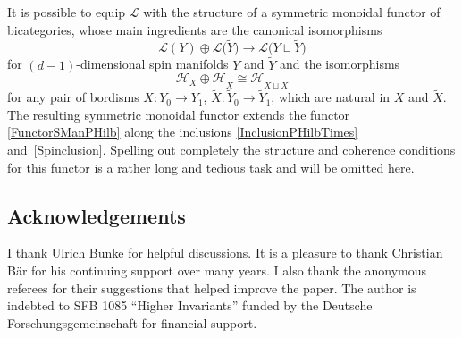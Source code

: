 \documentclass[pdftex]{sigma}
\numberwithin{equation}{section}
\begin{document}
It is possible to equip $\mathcal{L}$ with the structure of a symmetric monoidal functor of bicategories, whose main ingredients are the canonical isomorphisms
\begin{equation*}
 \mathcal{L}(Y) \oplus \mathcal{L}\big(\tilde{Y}\big) \longrightarrow \mathcal{L}\big(Y \sqcup \tilde{Y}\big)
\end{equation*}
for $(d-1)$-dimensional spin manifolds $Y$ and $\tilde{Y}$ and the isomorphisms
\begin{equation*}
 \mathcal{H}_{X} \oplus \mathcal{H}_{\tilde{X}} \cong \mathcal{H}_{X \sqcup \tilde{X}}
\end{equation*}
for any pair of bordisms $X \colon Y_0 \to Y_1$, $\tilde{X} \colon \tilde{Y}_0 \to \tilde{Y}_1$, which are natural in $X$ and $\tilde{X}$.
The resulting symmetric monoidal functor extends the functor \eqref{FunctorSManPHilb} along the inclusions \eqref{InclusionPHilbTimes} and~\eqref{Spinclusion}.
Spelling out completely the structure and coherence conditions for this functor is a rather long and tedious task and will be omitted here.

\subsection*{Acknowledgements}
I thank Ulrich Bunke for helpful discussions.
It is a pleasure to thank Christian B\"ar for his continuing support over many years.
I also thank the anonymous referees for their suggestions that helped improve the paper.
The author is indebted to SFB 1085 ``Higher Invariants'' funded by the Deutsche Forschungsgemeinschaft for financial support.
\end{document}
